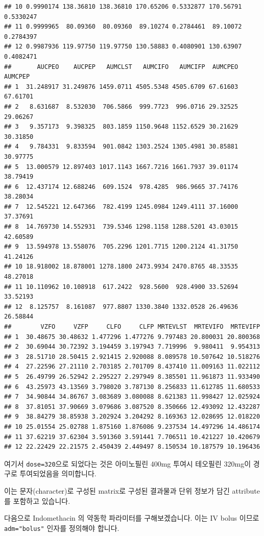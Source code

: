 \documentclass[12pt,]{krantz}
\begin{document}
\begin{verbatim}
## 10 0.9990174 138.36810 138.36810 170.65206 0.5332877 170.56791 0.5330247
## 11 0.9999965  80.09360  80.09360  89.10274 0.2784461  89.10072 0.2784397
## 12 0.9987936 119.97750 119.97750 130.58883 0.4080901 130.63907 0.4082471
##       AUCPEO    AUCPEP   AUMCLST   AUMCIFO   AUMCIFP  AUMCPEO  AUMCPEP
## 1  31.248917 31.249876 1459.0711 4505.5348 4505.6709 67.61603 67.61701
## 2   8.631687  8.532030  706.5866  999.7723  996.0716 29.32525 29.06267
## 3   9.357173  9.398325  803.1859 1150.9648 1152.6529 30.21629 30.31850
## 4   9.784331  9.833594  901.0842 1303.2524 1305.4981 30.85881 30.97775
## 5  13.000579 12.897403 1017.1143 1667.7216 1661.7937 39.01174 38.79419
## 6  12.437174 12.688246  609.1524  978.4285  986.9665 37.74176 38.28034
## 7  12.545221 12.647366  782.4199 1245.0984 1249.4111 37.16000 37.37691
## 8  14.769730 14.552931  739.5346 1298.1158 1288.5201 43.03015 42.60589
## 9  13.594978 13.558076  705.2296 1201.7715 1200.2124 41.31750 41.24126
## 10 18.918002 18.878001 1278.1800 2473.9934 2470.8765 48.33535 48.27018
## 11 10.110962 10.108918  617.2422  928.5600  928.4900 33.52694 33.52193
## 12  8.125757  8.161087  977.8807 1330.3840 1332.0528 26.49636 26.58844
##        VZFO     VZFP     CLFO     CLFP MRTEVLST  MRTEVIFO  MRTEVIFP
## 1  30.48675 30.48632 1.477296 1.477276 9.797483 20.800031 20.800368
## 2  30.69044 30.72392 3.194459 3.197943 7.719996  9.980411  9.954313
## 3  28.51710 28.50415 2.921415 2.920088 8.089578 10.507642 10.518276
## 4  27.22596 27.21110 2.703185 2.701709 8.437410 11.009163 11.022112
## 5  26.49799 26.52942 2.295227 2.297949 8.385501 11.961873 11.933490
## 6  43.25973 43.13569 3.798020 3.787130 8.256833 11.612785 11.680533
## 7  34.90844 34.86767 3.083689 3.080088 8.621383 11.998427 12.025924
## 8  37.81051 37.90669 3.079686 3.087520 8.350666 12.493092 12.432287
## 9  38.84279 38.85938 3.202924 3.204292 8.169363 12.028695 12.018220
## 10 25.01554 25.02788 1.875160 1.876086 9.237534 14.497296 14.486174
## 11 37.62219 37.62304 3.591360 3.591441 7.706511 10.421227 10.420679
## 12 22.22429 22.21575 2.450439 2.449497 8.150534 10.187579 10.196436
\end{verbatim}

여기서 \texttt{dose=320}으로 되었다는 것은 아미노필린 400mg 투여시 테오필린 320mg이 경구로 투여되었음을 의미합니다.

이는 문자(character)로 구성된 matrix로 구성된 결과물과 단위 정보가 담긴 attribute를 포함하고 있습니다.

다음으로 Indomethacin 의 약동학 파라미터를 구해보겠습니다.
이는 IV bolus 이므로 \texttt{adm="bolus"} 인자를 정의해야 합니다.
\end{document}
